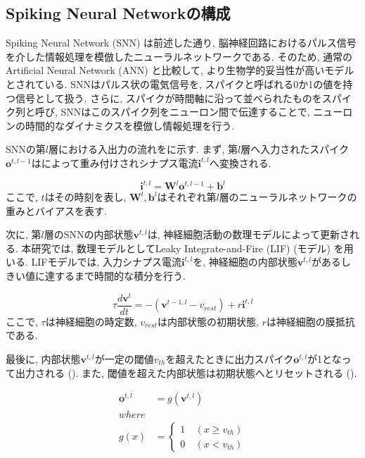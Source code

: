 \subsection{Spiking Neural Networkの構成}

Spiking Neural Network (SNN) は前述した通り, 脳神経回路におけるパルス信号を介した情報処理を模倣したニューラルネットワークである\cite{generalsnn}.
そのため, 通常のArtificial Neural Network (ANN) と比較して, より生物学的妥当性が高いモデルとされている.
SNNはパルス状の電気信号を, スパイクと呼ばれる0か1の値を持つ信号として扱う.
さらに, スパイクが時間軸に沿って並べられたものをスパイク列と呼び, SNNはこのスパイク列をニューロン間で伝達することで, ニューロンの時間的なダイナミクスを模倣し情報処理を行う.

SNNの第$l$層における入出力の流れをに示す.
まず, 第$l$層へ入力されたスパイク$\bm{o}^{t, l-1}$はによって重み付けされシナプス電流$\bm{i}^{t,l}$へ変換される.

\begin{equation}
    \bm{i}^{t, l} = \bm{W}^l\bm{o}^{t, l-1} + \bm{b}^l
    \label{eq:input_spike}
\end{equation}
ここで, $t$はその時刻を表し, $\bm{W}^l, \bm{b}^l$はそれぞれ第$l$層のニューラルネットワークの重みとバイアスを表す.

次に, 第$l$層のSNNの内部状態$\bm{v}^{t, l}$は, 神経細胞活動の数理モデルによって更新される.
本研究では, 数理モデルとしてLeaky Integrate-and-Fire (LIF) (モデル) を用いる.
LIFモデルでは, 入力シナプス電流$\bm{i}^{t, l}$を, 神経細胞の内部状態$\bm{v}^{t, l}$があるしきい値に達するまで時間的な積分を行う.

\begin{equation}
    {\tau}\frac{d\bm{v}^l}{dt}=-\left(\bm{v}^{t-1,l}-v_{rest}\right)+r\bm{i}^{t, l}
    \label{eq:lif}
\end{equation}
ここで, $\tau$は神経細胞の時定数, $v_{rest}$は内部状態の初期状態, $r$は神経細胞の膜抵抗である.

最後に, 内部状態$\bm{v}^{t, l}$が一定の閾値$v_{th}$を超えたときに出力スパイク$\bm{o}^{t, l}$が1となって出力される ().
また, 閾値を超えた内部状態は初期状態へとリセットされる ().

\begin{equation}
    \begin{split}
      \bm{o}^{t, l}&=g\left(\bm{v}^{t, l}\right)\\
    where\\
    g\left(x\right)&=\left\{
      \begin{alignedat}{2}
        1 &\:\left(x{\geq}v_{th}\right)\\
        0 &\:\left(x{<}v_{th}\right)
      \end{alignedat}
    \right. 
    \end{split} \label{eq:outputSpike}
  \end{equation}

